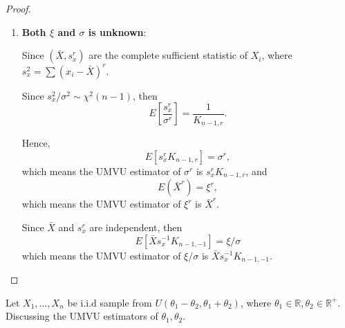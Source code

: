 \begin{proof}
\begin{enumerate}
        \item \textbf{Both $\xi$ and $\sigma$ is unknown}:

              Since $(\bar{X},s_x^r)$ are the complete sufficient statistic of $X_i$, where $s_x^2=\sum\left(x_{i}-\bar{X}\right)^r$.

              Since $s_x^2/\sigma^2\sim\chi^2(n-1)$, then
              \begin{equation*}
                  E\left[\frac{s_x^r}{\sigma^r}\right]=\frac{1}{K_{n-1,r}}.
              \end{equation*}

              Hence,
              \begin{equation*}
                  E\left[s_x^rK_{n-1,r}\right]=\sigma^r,
              \end{equation*}
              which means the UMVU estimator of $\sigma^r$ is $s_x^rK_{n-1,r}$,
              and
              \begin{equation*}
                  E(\bar{X}^r)=\xi^r,
              \end{equation*}
              which means the UMVU estimator of $\xi^r$ is $\bar{X}^r$.

              Since $\bar{X}$ and $s_x^r$ are independent, then
              \begin{equation*}
                  E[\bar{X}s_x^{-1}K_{n-1,-1}]=\xi/\sigma
              \end{equation*}
              which means the UMVU estimator of $\xi/\sigma$ is $\bar{X}s_x^{-1}K_{n-1,-1}$.
    \end{enumerate}
\end{proof}

\begin{example}[]
    Let $X_{1},\ldots,X_{n}$ be i.i.d sample from $U\left(\theta_1-\theta_2,\theta_1+\theta_2\right)$, where $\theta_1\in\mathbb{R},\theta_2\in\mathbb{R}^+$. Discussing the UMVU estimators of $\theta_1,\theta_2$.
\end{example}

